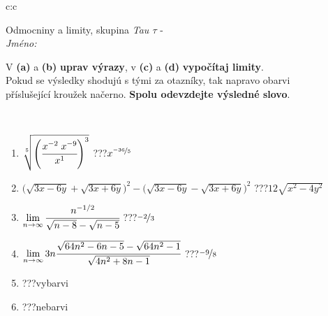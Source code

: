 \documentclass[10pt]{report}
\begin{document}
\newpage
\thispagestyle{empty}
\begin{tabular}{c:c}
\begin{minipage}[c][104.5mm][t]{0.5\linewidth}
\begin{center}
\vspace{7mm}
{\huge Odmocniny a limity, skupina \textit{Tau $\tau$} -}\\[5mm]
\textit{Jméno:}\phantom{xxxxxxxxxxxxxxxxxxxxxxxxxxxxxxxxxxxxxxxxxxxxxxxxxxxxxxxxxxxxxxxxx}\\[5mm]
\begin{minipage}{0.95\linewidth}
\begin{center}
V \textbf{(a)} a \textbf{(b)} \textbf{uprav výrazy}, v \textbf{(c)} a \textbf{(d)} \textbf{vypočítaj limity}.\\Pokud se výsledky shodujú s tými za otazníky, tak napravo obarvi\\příslušející kroužek načerno. \textbf{Spolu odevzdejte výsledné slovo}.
\end{center}
\end{minipage}
\\[1mm]
\begin{minipage}{0.79\linewidth}
\begin{center}
\begin{varwidth}{\linewidth}
\begin{enumerate}
\small
\item $\sqrt[5]{\left(\cfrac{x^{-2}\;x^{-9}}{x^{1}}\right)^{3}}$\quad \dotfill\; ???\;\dotfill \quad $x^{\nicefrac{-36}{5}}$
\item {\footnotesize{\scriptsize$\big(\sqrt{3x-6y}+\sqrt{3x+6y}\big)^2-\big(\sqrt{3x-6y}-\sqrt{3x+6y}\big)^2$}\quad \dotfill\; ???\;\dotfill \quad $12\sqrt{x^2-4y^2}$}
\item $\lim\limits_{n\to\infty}\cfrac{n^{-1/2}}{\sqrt{n-8}-\sqrt{n-5}}$\quad \dotfill\; ???\;\dotfill \quad $\nicefrac{-2}{3}$
\item $\lim\limits_{n\to\infty}3n\cfrac{\sqrt{64n^2-6n-5}-\sqrt{64n^2-1}}{\sqrt{4n^2+8n-1}}$\quad \dotfill\; ???\;\dotfill \quad $\nicefrac{-9}{8}$
\item \quad \dotfill\; ???\;\dotfill \quad vybarvi
\item \quad \dotfill\; ???\;\dotfill \quad nebarvi
\end{enumerate}
\end{varwidth}
\end{center}
\end{minipage}
\begin{minipage}{0.20\linewidth}

\end{minipage}
\end{center}
\end{minipage}
\end{tabular}
\end{document}
